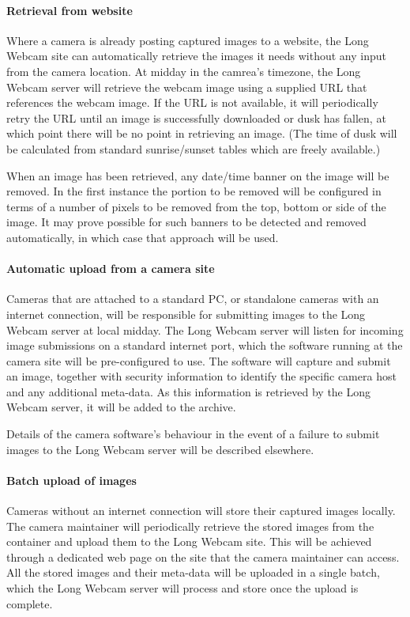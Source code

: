 \documentclass[11pt]{article}
\begin{document}
\paragraph{Retrieval from website}
Where a camera is already posting captured images to a website, the Long Webcam site can automatically retrieve the images it needs without any input from the camera location. At midday in the camrea's timezone, the Long Webcam server will retrieve the webcam image using a supplied URL that references the webcam image. If the URL is not available, it will periodically retry the URL until an image is successfully downloaded or dusk has fallen, at which point there will be no point in retrieving an image. (The time of dusk will be calculated from standard sunrise/sunset tables which are freely available.)

When an image has been retrieved, any date/time banner on the image will be removed. In the first instance the portion to be removed will be configured in terms of a number of pixels to be removed from the top, bottom or side of the image. It may prove possible for such banners to be detected and removed automatically, in which case that approach will be used.

\paragraph{Automatic upload from a camera site}
Cameras that are attached to a standard PC, or standalone cameras with an internet connection, will be responsible for submitting images to the Long Webcam server at local midday. The Long Webcam server will listen for incoming image submissions on a standard internet port, which the software running at the camera site will be pre-configured to use. The software will capture and submit an image, together with security information to identify the specific camera host and any additional meta-data. As this information is retrieved by the Long Webcam server, it will be added to the archive.

Details of the camera software's behaviour in the event of a failure to submit images to the Long Webcam server will be described elsewhere.

\paragraph{Batch upload of images}
Cameras without an internet connection will store their captured images locally. The camera maintainer will periodically retrieve the stored images from the container and upload them to the Long Webcam site. This will be achieved through a dedicated web page on the site that the camera maintainer can access. All the stored images and their meta-data will be uploaded in a single batch, which the Long Webcam server will process and store once the upload is complete.
\end{document}
